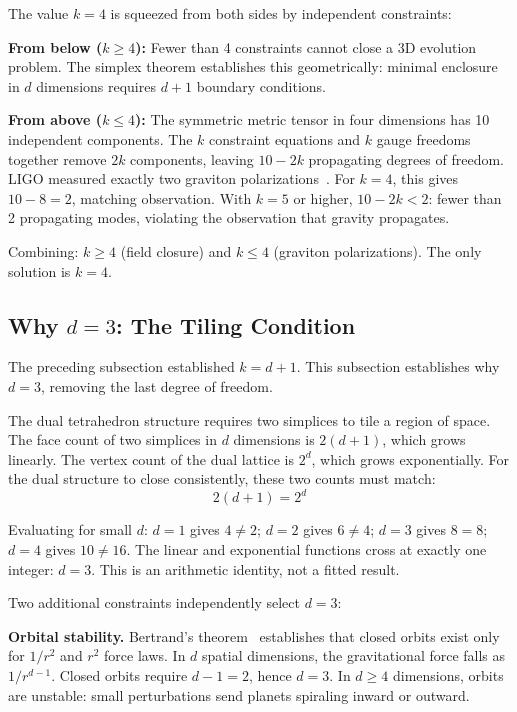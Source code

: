 \documentclass[aps,prd,preprint,superscriptaddress,showpacs,preprintnumbers,amsmath,amssymb,nofootinbib]{revtex4-2}
\begin{document}
The value $k = 4$ is squeezed from both sides by independent constraints:

\textbf{From below ($k \geq 4$):} Fewer than 4 constraints cannot close a 3D evolution problem. The simplex theorem establishes this geometrically: minimal enclosure in $d$ dimensions requires $d+1$ boundary conditions.

\textbf{From above ($k \leq 4$):} The symmetric metric tensor in four dimensions has 10 independent components. The $k$ constraint equations and $k$ gauge freedoms together remove $2k$ components, leaving $10 - 2k$ propagating degrees of freedom. LIGO measured exactly two graviton polarizations~\cite{gw170817}. For $k = 4$, this gives $10 - 8 = 2$, matching observation. With $k = 5$ or higher, $10 - 2k < 2$: fewer than 2 propagating modes, violating the observation that gravity propagates.

Combining: $k \geq 4$ (field closure) and $k \leq 4$ (graviton polarizations). The only solution is $k = 4$.

\subsection{Why $d = 3$: The Tiling Condition}
\label{subsec:d3}

The preceding subsection established $k = d + 1$. This subsection establishes why $d = 3$, removing the last degree of freedom.

The dual tetrahedron structure requires two simplices to tile a region of space. The face count of two simplices in $d$ dimensions is $2(d+1)$, which grows linearly. The vertex count of the dual lattice is $2^d$, which grows exponentially. For the dual structure to close consistently, these two counts must match:
\begin{equation}
2(d+1) = 2^d
\label{eq:tiling}
\end{equation}

Evaluating for small $d$: $d = 1$ gives $4 \neq 2$; $d = 2$ gives $6 \neq 4$; $d = 3$ gives $8 = 8$; $d = 4$ gives $10 \neq 16$. The linear and exponential functions cross at exactly one integer: $d = 3$. This is an arithmetic identity, not a fitted result.

Two additional constraints independently select $d = 3$:

\textbf{Orbital stability.} Bertrand's theorem~\cite{goldstein2002} establishes that closed orbits exist only for $1/r^2$ and $r^2$ force laws. In $d$ spatial dimensions, the gravitational force falls as $1/r^{d-1}$. Closed orbits require $d - 1 = 2$, hence $d = 3$. In $d \geq 4$ dimensions, orbits are unstable: small perturbations send planets spiraling inward or outward.
\end{document}
